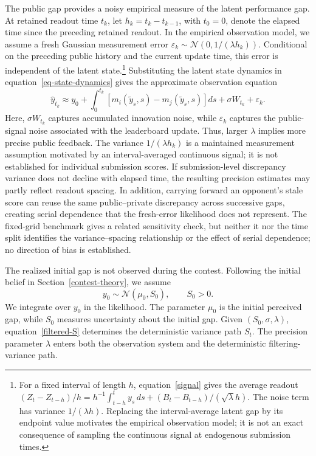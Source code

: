 \documentclass[mnsc]{informs3}
\begin{document}
{The public gap provides a noisy empirical measure of the latent performance gap. {At retained readout time $t_k$, let $h_k=t_k-t_{k-1}$, with $t_0=0$, denote the elapsed time since the preceding retained readout.} In the empirical observation model, we assume a fresh Gaussian measurement error $\varepsilon_k\sim\mathcal N(0,1/(\lambda h_k))$. Conditional on the preceding public history and the current update time, this error is independent of the latent state.\footnote{{\color{black}For a fixed interval of length $h$, equation~\eqref{signal} gives the average readout $(Z_t-Z_{t-h})/h=h^{-1}\int_{t-h}^t y_s\,ds+(B_t-B_{t-h})/(\sqrt\lambda h)$. The noise term has variance $1/(\lambda h)$. Replacing the interval-average latent gap by its endpoint value motivates the empirical observation model; it is not an exact consequence of sampling the continuous signal at endogenous submission times.}} Substituting the latent state dynamics in equation~\eqref{eq-state-dynamics} gives the approximate observation equation}
\begin{equation}\label{eq-leaderboard-gap}
\hat y_{t_k}
\approx
{y_0+\int_0^{t_k}\left[m_i(\tilde{y}_s,s)-m_j(\tilde{y}_s,s)\right]ds}
+\sigma W_{t_k}
+\varepsilon_k.
\end{equation}
Here, $\sigma W_{t_k}$ captures accumulated innovation noise, while $\varepsilon_k$ captures the public-signal noise associated with the leaderboard update.
Thus, larger $\lambda$ implies more precise public feedback.
The variance $1/(\lambda h_k)$ is a maintained measurement assumption motivated by an interval-averaged continuous signal; it is not established for individual submission scores. If submission-level discrepancy variance does not decline with elapsed time, the resulting precision estimates may partly reflect readout spacing. In addition, carrying forward an opponent's stale score can reuse the same public--private discrepancy across successive gaps, creating serial dependence that the fresh-error likelihood does not represent. The fixed-grid benchmark gives a related sensitivity check, but neither it nor the time split identifies the variance--spacing relationship or the effect of serial dependence; no direction of bias is established.

{The realized initial gap is not observed during the contest. Following the initial belief in Section~\ref{contest-theory}, we assume}
\begin{equation}\label{eq-empirical-initial-state}
{y_0\sim\mathcal N\!\left(\mu_0,S_0\right),
\qquad S_0>0.}
\end{equation}
{We integrate over $y_0$ in the likelihood. The parameter $\mu_0$ is the initial perceived gap, while $S_0$ measures uncertainty about the initial gap. Given $(S_0,\sigma,\lambda)$, equation~\eqref{filtered-S} determines the deterministic variance path $S_t$.}
{The precision parameter $\lambda$ enters both the observation system and the deterministic filtering-variance path.}
\end{document}
